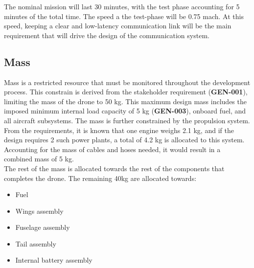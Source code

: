 The nominal mission will last 30 minutes, with the test phase accounting for 5 minutes of the total time. The speed a the test-phase will be 0.75 mach. At this speed, keeping a clear and low-latency communication link will be the main requirement that will drive the design of the communication system.




\subsection{Mass}
Mass is a restricted resource that must be monitored throughout the development process. This constrain is derived from the stakeholder requirement (\textbf{GEN-001}), limiting the mass of the drone to 50 kg. This maximum design mass includes the imposed minimum internal load capacity of 5 kg (\textbf{GEN-003}), onboard fuel, and all aircraft subsystems.
The mass is further constrained by the propulsion system. From the requirements, it is known that one engine weighs 2.1 kg, and if the design requires 2 such power plants, a total of 4.2 kg is allocated to this system. Accounting for the mass of cables and hoses needed, it would result in a combined mass of 5 kg.\\
The rest of the mass is allocated towards the rest of the components that completes the drone. The remaining 40kg are allocated towards:




\begin{itemize}
    \item Fuel 
    \item Wings assembly
    \item Fuselage assembly
    \item Tail assembly
    \item Internal battery assembly
\end{itemize}

